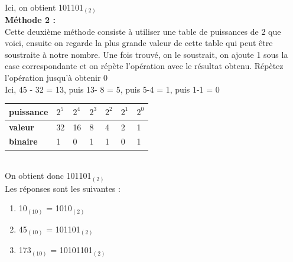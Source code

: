 \begin{Exercice}[5 minutes]
\begin{solution}
\begin{tabular}{| C{0.1\textwidth} | C{0.1\textwidth} |}
        \end{tabular} \\

        Ici, on obtient 101101$_{(2)}$ \\
        
        \textbf{Méthode 2 :} \\
        
        Cette deuxième méthode consiste à utiliser une table de puissances de 2 que voici, ensuite on regarde la plus grande valeur de cette table qui peut être soustraite à notre nombre. Une fois trouvé, on le soustrait, on ajoute 1 sous la case correspondante et on répète l'opération avec le résultat obtenu. Répètez l'opération jusqu'à obtenir 0\\
        
Ici, 45 - 32 = 13, puis 13- 8 = 5, puis 5-4 = 1, puis 1-1 = 0 \\
        
   		\begin{tabular}{| C{0.1\textwidth} | C{0.1\textwidth} | C{0.1\textwidth} | C{0.1\textwidth} | C{0.1\textwidth} | C{0.1\textwidth} | C{0.1\textwidth} |} 
            \hline
            \textbf{puissance} & $2^{5}$ & $2^{4}$ & $2^{3}$ & $2^{2}$ & $2^{1}$ & $2^{0}$ \\ [0.5ex] 
            \hline
            \textbf{valeur} & 32 & 16 & 8 & 4 & 2 & 1 \\ [0.5ex] 
            \hline
            \textbf{binaire} & 1 & 0 & 1 & 1 & 0 & 1 \\ [0.5ex] 
            \hline
        \end{tabular} \\
        
        On obtient donc 101101$_{(2)}$ \\
        
        Les réponses sont les suivantes :
        \begin{enumerate}
        \item 10$_{(10)}$ = 1010$_{(2)}$
        \item 45$_{(10)}$ = 101101$_{(2)}$
        \item 173$_{(10)}$ = 10101101$_{(2)}$
        \end{enumerate}
    \end{solution}
\end{Exercice}


